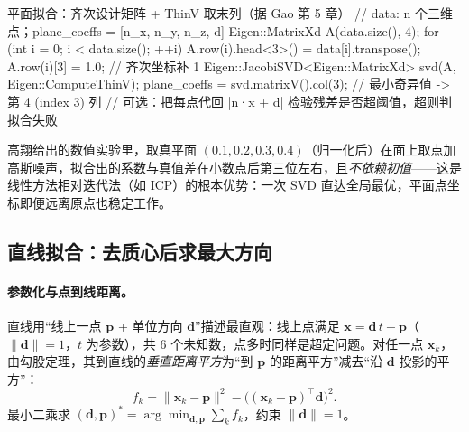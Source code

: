 \begin{codebox}[C++]{平面拟合：齐次设计矩阵 + ThinV 取末列（据 Gao 第 5 章）}
// data: n 个三维点；plane_coeffs = [n_x, n_y, n_z, d]
Eigen::MatrixXd A(data.size(), 4);
for (int i = 0; i < data.size(); ++i) {
  A.row(i).head<3>() = data[i].transpose();
  A.row(i)[3]        = 1.0;                 // 齐次坐标补 1
}
Eigen::JacobiSVD<Eigen::MatrixXd> svd(A, Eigen::ComputeThinV);
plane_coeffs = svd.matrixV().col(3);       // 最小奇异值 -> 第 4 (index 3) 列
// 可选：把每点代回 |n·x + d| 检验残差是否超阈值，超则判拟合失败
\end{codebox}

\noindent 高翔给出的数值实验里，取真平面 $(0.1,0.2,0.3,0.4)$（归一化后）在面上取点加高斯噪声，拟合出的系数与真值差在小数点后第三位左右，且\emph{不依赖初值}——这是线性方法相对迭代法（如 ICP）的根本优势：一次 SVD 直达全局最优，平面点坐标即便远离原点也稳定工作\cite{gao2023slamad}。

\subsection{直线拟合：去质心后求最大方向}
\label{sec:pc-fit-line}

\paragraph{参数化与点到线距离。}
直线用“线上一点 $\mathbf{p}$ + 单位方向 $\mathbf{d}$”描述最直观：线上点满足 $\mathbf{x}=\mathbf{d}\,t+\mathbf{p}$（$\|\mathbf{d}\|=1$，$t$ 为参数），共 $6$ 个未知数，点多时同样是超定问题。对任一点 $\mathbf{x}_k$，由勾股定理，其到直线的\emph{垂直距离平方}为“到 $\mathbf{p}$ 的距离平方”减去“沿 $\mathbf{d}$ 投影的平方”：
\begin{equation}
  f_k=\|\mathbf{x}_k-\mathbf{p}\|^2-\big((\mathbf{x}_k-\mathbf{p})^\top\mathbf{d}\big)^2 .
  \label{eq:pc-line-fk}
\end{equation}
最小二乘求 $(\mathbf{d},\mathbf{p})^\ast=\arg\min_{\mathbf{d},\mathbf{p}}\sum_k f_k$，约束 $\|\mathbf{d}\|=1$。


